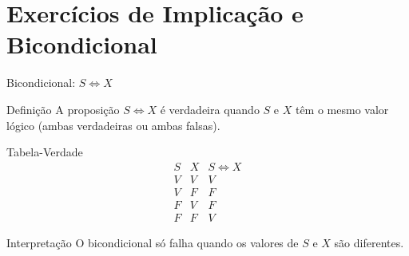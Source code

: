 \documentclass[9pt]{beamer}
\begin{document}
\section{Exercícios de Implicação e Bicondicional}

\begin{frame}{Bicondicional: $S \Leftrightarrow X$}
\Large

\begin{block}{Definição}
A proposição $S \Leftrightarrow X$ é verdadeira quando $S$ e $X$ têm o mesmo valor lógico (ambas verdadeiras ou ambas falsas).
\end{block}

\begin{block}{Tabela-Verdade}
\[
\begin{array}{c|c|c}
S & X & S \Leftrightarrow X \\ \hline
V & V & V \\
V & F & F \\
F & V & F \\
F & F & V
\end{array}
\]
\end{block}

\begin{block}{Interpretação}
O bicondicional só falha quando os valores de $S$ e $X$ são diferentes.
\end{block}

\end{frame}








\end{document}
